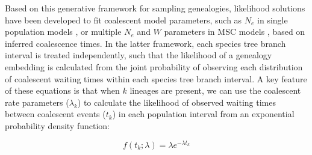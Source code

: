 \documentclass[11pt]{article}
\begin{document}
Based on this generative framework for sampling genealogies, likelihood
solutions have been developed to fit coalescent model parameters, such as 
$N_e$ in single population models \citep{kingman1982coalescent},
or multiple $N_e$ and $W$ parameters in MSC models \citep{rannala2003bayes}, 
based on inferred coalescence times. 
In the latter framework, each species tree branch interval is treated independently, 
such that the likelihood of a genealogy embedding is calculated from the joint
probability of observing each distribution of coalescent waiting times within
each species tree branch interval. A key feature of these equations is that 
when $k$ lineages are present, we can use the coalescent rate parameters 
($\lambda_k$)
to calculate the likelihood of observed waiting times between coalescent 
events ($t_k$) in each population interval from an exponential probability 
density function:
	
\begin{equation}
	f(t_k; \lambda) = \lambda e^{-\lambda t_k}
\end{equation}





\end{document}
